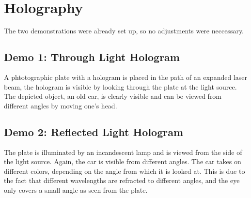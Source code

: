 \chapter{Holography}
The two demonstrations were already set up, so no adjustments were neccessary.

\section*{Demo 1: Through Light Hologram}
A phtotographic plate with a hologram is placed in the path of an expanded laser beam, the hologram is visible by looking through the plate at the light source.
The depicted object, an old car, is clearly visible and can be viewed from different angles by moving one's head.

\section*{Demo 2: Reflected Light Hologram}
The plate is illuminated by an incandescent lamp and is viewed from the side of the light source.
Again, the car is visible from different angles.
The car takes on different colors, depending on the angle from which it is looked at.
This is due to the fact that different wavelengths are refracted to different angles, and the eye only covers a small angle as seen from the plate.
